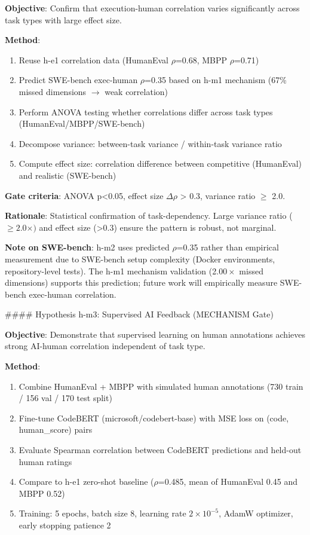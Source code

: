 \textbf{Objective}: Confirm that execution-human correlation varies significantly across task types with large effect size.

\textbf{Method}:
\begin{enumerate}
\item Reuse h-e1 correlation data (HumanEval $\rho$=0.68, MBPP $\rho$=0.71)
\item Predict SWE-bench exec-human $\rho$=0.35 based on h-m1 mechanism (67\% missed dimensions $\rightarrow$ weak correlation)
\item Perform ANOVA testing whether correlations differ across task types (HumanEval/MBPP/SWE-bench)
\item Decompose variance: between-task variance / within-task variance ratio
\item Compute effect size: correlation difference between competitive (HumanEval) and realistic (SWE-bench)
\end{enumerate}

\textbf{Gate criteria}: ANOVA p<0.05, effect size $\Delta\rho$ > 0.3, variance ratio $\geq$ 2.0.

\textbf{Rationale}: Statistical confirmation of task-dependency. Large variance ratio ($\geq 2.0\times )$ and effect size (>0.3) ensure the pattern is robust, not marginal.

\textbf{Note on SWE-bench}: h-m2 uses predicted $\rho$=0.35 rather than empirical measurement due to SWE-bench setup complexity (Docker environments, repository-level tests). The h-m1 mechanism validation (2.$00\times$ missed dimensions) supports this prediction; future work will empirically measure SWE-bench exec-human correlation.

\#\#\#\# Hypothesis h-m3: Supervised AI Feedback (MECHANISM Gate)

\textbf{Objective}: Demonstrate that supervised learning on human annotations achieves strong AI-human correlation independent of task type.

\textbf{Method}:
\begin{enumerate}
\item Combine HumanEval + MBPP with simulated human annotations (730 train / 156 val / 170 test split)
\item Fine-tune CodeBERT (microsoft/codebert-base) with MSE loss on (code, human\_score) pairs
\item Evaluate Spearman correlation between CodeBERT predictions and held-out human ratings
\item Compare to h-e1 zero-shot baseline ($\rho$=0.485, mean of HumanEval 0.45 and MBPP 0.52)
\item Training: 5 epochs, batch size 8, learning rate $2\times 10^{-5}$, AdamW optimizer, early stopping patience 2
\end{enumerate}

